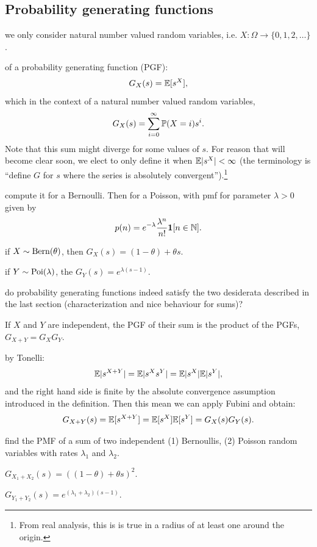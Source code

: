 \documentclass{article}
\begin{document}
\subsection{Probability generating functions}

 we only consider natural number valued random variables, i.e. $X : \Omega \to \{0, 1, 2, \dots \}$.

 of a probability generating function (PGF):
\[ G_X(s) = \E[s^X], \]
which in the context of a natural number valued random variables,
\[ G_X(s) = \sum_{i=0}^\infty \P(X = i) s^i. \]
Note that this sum might diverge for some values of $s$. For reason that will become clear soon, we elect to only define it when $\E|s^X| < \infty$ (the terminology is ``define $G$ for $s$ where the series is absolutely convergent'').\footnote{From real analysis, this is is true in a radius of at least one around the origin.}

 compute it for a Bernoulli. Then for a Poisson, with pmf for parameter $\lambda > 0$ given by \[p(n) = e^{-\lambda} \frac{\lambda^n}{n!} \1[n\in \N]. \]

 if $X \sim \Bern(\theta)$, then $G_X(s) = (1-\theta) + \theta s$.

 if $Y \sim \Poi(\lambda)$, the $G_Y(s) = e^{\lambda(s-1)}$. 

 do  probability generating functions indeed satisfy the two desiderata described in the last section (characterization and nice behaviour for sums)?

 If $X$ and $Y$ are independent, the PGF of their sum is the product of the PGFs, $G_{X+Y} = G_X G_Y$.

 by Tonelli:
\[ \E |s^{X+Y}| = \E | s^X s^Y | = \E | s^X | \E |s^Y|, \]
and the right hand side is finite by the absolute convergence assumption introduced in the definition. Then this mean we can apply Fubini and obtain:
\[ G_{X+Y}(s) = \E [s^{X+Y}] = \E [s^X] \E [s^Y] = G_X(s) G_Y(s). \]

 find the PMF of a sum of two independent (1) Bernoullis, (2) Poisson random variables with rates $\lambda_1$ and $\lambda_2$.

 $G_{X_1 + X_2}(s) = ((1-\theta) + \theta s)^2$.

 $G_{Y_1+Y_2}(s) = e^{(\lambda_1+\lambda_2)(s-1)}$.
\end{document}
